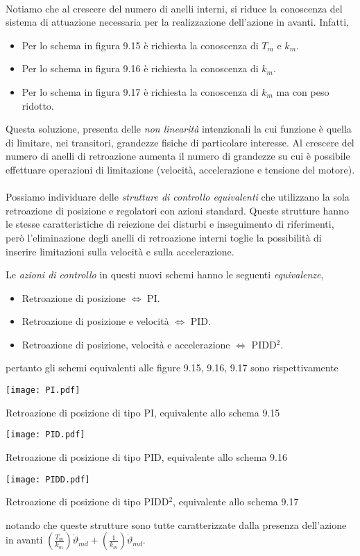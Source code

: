 \paragraph{}
Notiamo che al crescere del numero di anelli interni, si riduce la conoscenza del sistema di attuazione necessaria per la realizzazione dell'azione in avanti. Infatti,
\begin{itemize}
	\item Per lo schema in figura 9.15 è richiesta la conoscenza di $T_m$ e $k_m$.
	\item Per lo schema in figura 9.16 è richiesta la conoscenza di $k_m$.
	\item Per lo schema in figura 9.17 è richiesta la conoscenza di $k_m$ ma con peso ridotto.
\end{itemize}

Questa soluzione, presenta delle \emph{non linearità} intenzionali la cui funzione è quella di limitare, nei transitori, grandezze fisiche di particolare interesse. Al crescere del numero di anelli di retroazione aumenta il numero di grandezze su cui è possibile effettuare operazioni di limitazione (velocità, accelerazione e tensione del motore). 

\paragraph{}
Possiamo individuare delle \emph{strutture di controllo equivalenti} che utilizzano la sola retroazione di posizione e regolatori con azioni standard. Queste strutture hanno le stesse caratteristiche di reiezione dei disturbi e inseguimento di riferimenti, però l'eliminazione degli anelli di retroazione interni toglie la possibilità di inserire limitazioni sulla velocità e sulla accelerazione. 

Le \emph{azioni di controllo} in questi nuovi schemi hanno le seguenti \emph{equivalenze},
\begin{itemize}
	\item Retroazione di posizione $\Longleftrightarrow$ PI.
	\item Retroazione di posizione e velocità $\Longleftrightarrow$ PID.
	\item Retroazione di posizione, velocità e accelerazione $\Longleftrightarrow$ PIDD$^2$.
\end{itemize}
pertanto gli schemi equivalenti alle figure 9.15, 9.16, 9.17 sono rispettivamente
\begin{center}
	\texttt{[image: PI.pdf]}
	\caption{Retroazione di posizione di tipo PI, equivalente allo schema 9.15}
	
	\texttt{[image: PID.pdf]}
	\caption{Retroazione di posizione di tipo PID, equivalente allo schema 9.16}
	
	\texttt{[image: PIDD.pdf]}
	\caption{Retroazione di posizione di tipo PIDD$^2$, equivalente allo schema 9.17}
\end{center}
notando che queste strutture sono tutte caratterizzate dalla presenza dell'azione in avanti $(\frac{T_m}{k_m})\dot{\vartheta}_{md} + (\frac{1}{k_m}) \dot{\vartheta}_{md}$.

